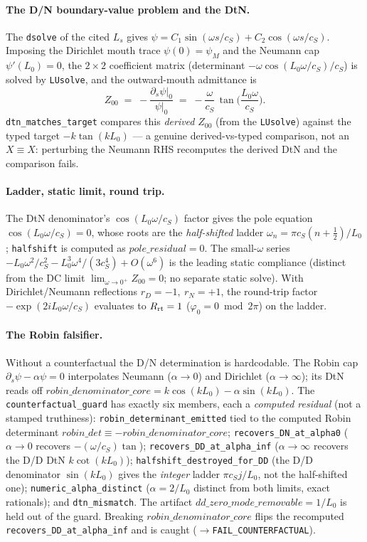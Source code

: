 \paragraph{The D/N boundary-value problem and the DtN.}
The \texttt{dsolve} of the cited \(L_s\) gives
\(\psi=C_1\sin(\omega s/c_S)+C_2\cos(\omega s/c_S)\). Imposing the Dirichlet
mouth trace \(\psi(0)=\psi_M\) and the Neumann cap \(\psi'(L_0)=0\), the \(2\times2\)
coefficient matrix (determinant \(-\omega\cos(L_0\omega/c_S)/c_S\)) is solved by
\texttt{LUsolve}, and the outward-mouth admittance is
\[
  Z_{00} \;=\; -\frac{\partial_s\psi|_0}{\psi|_0} \;=\; -\frac{\omega}{c_S}\,\tan\!\Big(\frac{L_0\omega}{c_S}\Big).
\]
\texttt{dtn\_matches\_target} compares this \emph{derived} \(Z_{00}\) (from the
\texttt{LUsolve}) against the typed target \(-k\tan(kL_0)\) --- a genuine
derived-vs-typed comparison, not an \(X\equiv X\): perturbing the Neumann RHS
recomputes the derived DtN and the comparison fails.

\paragraph{Ladder, static limit, round trip.}
The DtN denominator's \(\cos(L_0\omega/c_S)\) factor gives the pole equation
\(\cos(L_0\omega/c_S)=0\), whose roots are the \emph{half-shifted} ladder
\(\omega_n=\pi c_S(n+\tfrac12)/L_0\); \texttt{halfshift} is computed as
\(pole\_residual=0\). The small-\(\omega\) series
\(-L_0\omega^2/c_S^2-L_0^3\omega^4/(3c_S^4)+O(\omega^6)\) is the leading static
compliance (distinct from the DC limit \(\lim_{\omega\to0^+}Z_{00}=0\); no
separate static solve). With Dirichlet/Neumann reflections \(r_D=-1,\ r_N=+1\),
the round-trip factor \(-\exp(2iL_0\omega/c_S)\) evaluates to \(R_{\rm rt}=1\)
(\(\varphi_0=0 \bmod 2\pi\)) on the ladder.

\paragraph{The Robin falsifier.}
Without a counterfactual the D/N determination is hardcodable. The Robin cap
\(\partial_s\psi-\alpha\psi=0\) interpolates Neumann (\(\alpha\to0\)) and
Dirichlet (\(\alpha\to\infty\)); its DtN reads off
\(robin\_denominator\_core=k\cos(kL_0)-\alpha\sin(kL_0)\). The
\texttt{counterfactual\_guard} has exactly six members, each a \emph{computed
residual} (not a stamped truthiness): \texttt{robin\_determinant\_emitted} tied
to the computed Robin determinant \(robin\_det\equiv-robin\_denominator\_core\);
\texttt{recovers\_DN\_at\_alpha0} (\(\alpha\to0\) recovers \(-(\omega/c_S)\tan\));
\texttt{recovers\_DD\_at\_alpha\_inf} (\(\alpha\to\infty\) recovers the D/D DtN
\(k\cot(kL_0)\)); \texttt{halfshift\_destroyed\_for\_DD} (the D/D denominator
\(\sin(kL_0)\) gives the \emph{integer} ladder \(\pi c_S j/L_0\), not the
half-shifted one); \texttt{numeric\_alpha\_distinct} (\(\alpha=2/L_0\) distinct
from both limits, exact rationals); and \texttt{dtn\_mismatch}. The artifact
\(dd\_zero\_mode\_removable=1/L_0\) is held out of the guard. Breaking
\(robin\_denominator\_core\) flips the recomputed \texttt{recovers\_DD\_at\_alpha\_inf}
and is caught (\(\to\)\texttt{FAIL\_COUNTERFACTUAL}).

